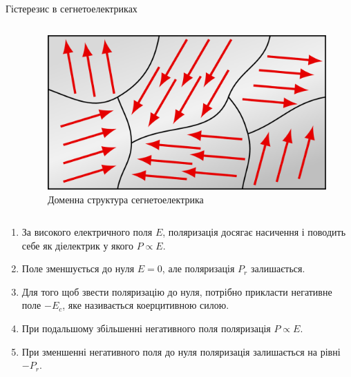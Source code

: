 \documentclass[]{beamer}
\begin{document}
\begin{frame}{Гістерезис в сегнетоелектриках}{}
\begin{columns}
\begin{column}{0.5\linewidth}
		\end{column}
		\begin{column}{0.8\linewidth}
			\begin{figure}
				\includegraphics[width=0.5\linewidth]{domains}
				\caption{\centering\scriptsize Доменна структура сегнетоелектрика}
			\end{figure}
		\end{column}
	\end{columns}
	\begin{enumerate}\justifying\scriptsize
		\item За високого електричного поля $ E $, поляризація досягає насичення і поводить себе як
		      діелектрик у якого $P \propto E$.
		\item  Поле зменшується до нуля $E = 0$, але поляризація $ P_r $ залишається.
		\item Для того щоб звести поляризацію до нуля, потрібно прикласти негативне поле $-E_c$,
		      яке називається \alert{коерцитивною силою}.
		\item При подальшому збільшенні негативного поля поляризація $P \propto E$.
		\item  При зменшенні негативного поля до нуля поляризація залишається на рівні $ -P_r $.
	\end{enumerate}
\end{frame}
\end{document}

